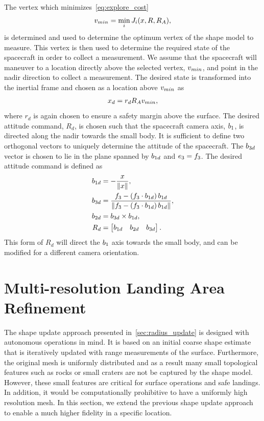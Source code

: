 The vertex which minimizes~\cref{eq:explore_cost} 
\begin{align*}
    v_{min} = \min_{i} J_i(x, R, R_A),
\end{align*}
is determined and used to determine the optimum vertex of the shape model to measure.
This vertex is then used to determine the required state of the spacecraft in order to collect a measurement.
We assume that the spacecraft will maneuver to a location directly above the selected vertex, \( v_{min} \), and point in the nadir direction to collect a measurement.
The desired state is transformed into the inertial frame and chosen as a location above \( v_{min} \) as
\begin{align}
    x_d = r_d R_A v_{min}, 
\end{align}
where \( r_d \) is again chosen to ensure a safety margin above the surface.
The desired attitude command, \( R_d\), is chosen such that the spacecraft camera axis, \( b_1 \), is directed along the nadir towards the small body.
It is sufficient to define two orthogonal vectors to uniquely determine the attitude of the spacecraft.
The \( b_{3d} \) vector is chosen to lie in the plane spanned by \(b_{1d} \) and \( e_3 = f_3 \).
The desired attitude command is defined as
\begin{align}
    b_{1d} &= - \frac{x}{\left\| x \right\|} , \\
    b_{3d} &= \frac{f_3 - \left( f_3 \cdot b_{1d} \right) b_{1d}}{\left\| f_3 - \left( f_3 \cdot b_{1d} \right) b_{1d} \right\|}, \\
    b_{2d} &= b_{3d} \times b_{1d} , \\
    R_d &= \begin{bmatrix} b_{1d} & b_{2d} & b_{3d} \end{bmatrix} .
\end{align}
This form of \( R_d \) will direct the \( b_{1} \) axis towards the small body, and can be modified for a different camera orientation.

\section{Multi-resolution Landing Area Refinement}\label{sec:landing_refinement}

The shape update approach presented in~\cref{sec:radius_update} is designed with autonomous operations in mind. 
It is based on an initial coarse shape estimate that is iteratively updated with range measurements of the surface.
Furthermore, the original mesh is uniformly distributed and as a result many small topological features such as rocks or small craters are not be captured by the shape model. 
However, these small features are critical for surface operations and safe landings.
In addition, it would be computationally prohibitive to have a uniformly high resolution mesh.
In this section, we extend the previous shape update approach to enable a much higher fidelity in a specific location.

